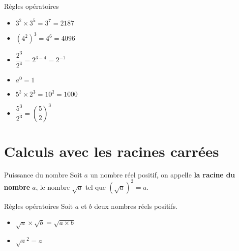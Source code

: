 \begin{pageCours}
\begin{ThT}{Règles opératoires}
\end{ThT}
 

 
 
\begin{Ex}

\begin{minipage}{0.33\linewidth}
\begin{itemize}
\item $3^2 \times 3^5 = 3^{7}=2187$ 
\item $\left(4^2 \right)^3 =4^6=4096$ 

\end{itemize}
\end{minipage}
\begin{minipage}{0.33\linewidth}
\begin{itemize}
\item $\dfrac{2^3}{2^4} =  2^{3-4} =  2^{-1}$ 
\item $a^0=1 $
 
\end{itemize}
\end{minipage}
\begin{minipage}{0.33\linewidth}
\begin{itemize}
\item $5^3 \times 2^3 = 10^3=1000$ 
\item $\dfrac{5^3}{2^3} = \left( \dfrac{5}{2} \right)^3 $ 
\end{itemize}
\end{minipage}

\end{Ex}
 
 
 

\section{Calculs avec les racines carrées}

\begin{DefT}{Puissance du nombre}
Soit $a$ un nombre réel positif, on appelle \textbf{la racine du nombre} $a$, le nombre $\sqrt a$ tel que $\left( \sqrt a \right)^2=a$.
\end{DefT}




\begin{ThT}{Règles opératoires}
Soit $a$ et $b$ deux nombres réels positifs.


\begin{minipage}{0.33\linewidth}
\begin{itemize}
\item $\sqrt a  \times \sqrt b = \sqrt{a\times b}$ 
\item $\sqrt a^2 = a$ 


\end{itemize}
\end{minipage}
\end{ThT}
\end{pageCours}
